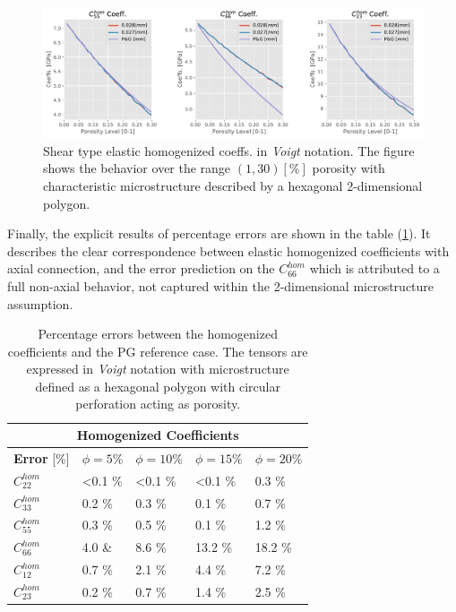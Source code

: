 \begin{figure}[!h]
	\centering
	\includegraphics[scale=.5]{images/CellsProb/CellProb_OthersHomCoeffsCircularHexa.pdf}
	\caption{Shear type elastic homogenized coeffs. in \textit{Voigt} notation. The figure shows the behavior over the range $(1,30) [\%]$ porosity with characteristic microstructure described by a hexagonal 2-dimensional polygon.}
	\label{OtherHomoCoeffsHexa}
\end{figure}
Finally, the explicit results of percentage errors are shown in the table (\ref{HomCoeffHexaTable}). It describes the clear correspondence between elastic homogenized coefficients with axial connection, and the error prediction on the $C_{66}^{hom}$ which is attributed to a full non-axial behavior, not captured within the 2-dimensional microstructure assumption.

\begin{table}[!h]

\centering
    \begin{tabular}{ |p{2.2cm}||p{2cm}|p{2cm}|p{2cm}|p{2cm}| }
    \hline
    \multicolumn{5}{|c|}{\textbf{Homogenized Coefficients}} \\
    \hline
    \textbf{Error} [\%] & $\phi = 5 \%$ & $\phi = 10 \%$ & $\phi = 15 \%$ & $\phi = 20 \%$ \\
    \hline
    $C^{hom}_{22}$ & <0.1 \% & <0.1 \% & <0.1 \% & 0.3 \% \\
    $C^{hom}_{33}$ & 0.2 \% & 0.3 \% & 0.1 \% & 0.7 \% \\
    $C^{hom}_{55}$ & 0.3 \% & 0.5 \% & 0.1 \% & 1.2 \% \\
    $C^{hom}_{66}$ & 4.0 \& & 8.6 \% & 13.2 \% & 18.2 \% \\
    $C^{hom}_{12}$ & 0.7 \% & 2.1 \% & 4.4 \% & 7.2 \% \\
    $C^{hom}_{23}$ & 0.2 \% & 0.7 \% & 1.4 \% & 2.5 \% \\
    \hline
    \end{tabular}
    \caption{Percentage errors between the homogenized coefficients and the PG reference case. The tensors are expressed in \textit{Voigt} notation with microstructure defined as a hexagonal polygon with circular perforation acting as porosity.}
    \label{HomCoeffHexaTable}
\end{table}

